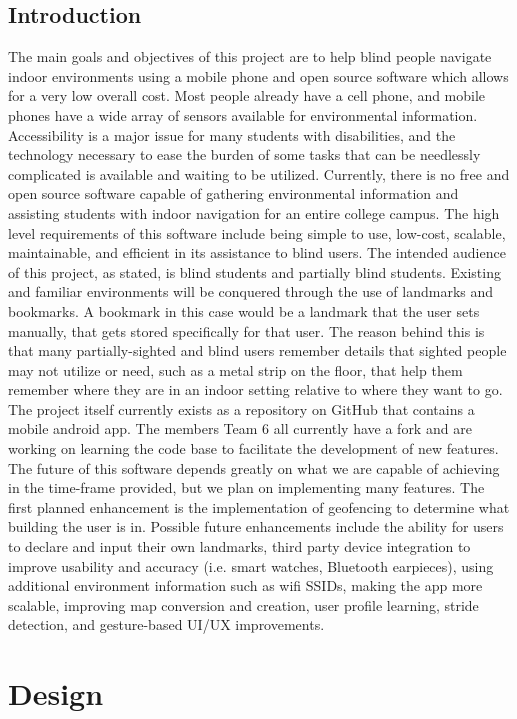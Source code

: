 \documentclass{scrreprt}
\begin{document}
	\section{Introduction}
The main goals and objectives of this project are to help blind people navigate indoor environments using a mobile phone and open source software which allows for a very low overall cost. Most people already have a cell phone, and mobile phones have a wide array of sensors available for environmental information. Accessibility is a major issue for many students with disabilities, and the technology necessary to ease the burden of some tasks that can be needlessly complicated is available and waiting to be utilized. Currently, there is no free and open source software capable of gathering environmental information and assisting students with indoor navigation for an entire college campus.
    The high level requirements of this software include being simple to use, low-cost, scalable, maintainable, and efficient in its assistance to blind users. The intended audience of this project, as stated, is blind students and partially blind students. Existing and familiar environments will be conquered through the use of landmarks and bookmarks. A bookmark in this case would be a landmark that the user sets manually, that gets stored specifically for that user. The reason behind this is that many partially-sighted and blind users remember details that sighted people may not utilize or need, such as a metal strip on the floor, that help them remember where they are in an indoor setting relative to where they want to go.
    The project itself currently exists as a repository on GitHub that contains a mobile android app. The members Team 6 all currently have a fork and are working on learning the code base to facilitate the development of new features. The future of this software depends greatly on what we are capable of achieving in the time-frame provided, but we plan on implementing many features. The first planned enhancement is the implementation of geofencing to determine what building the user is in. Possible future enhancements include the ability for users to declare and input their own landmarks, third party device integration to improve usability and accuracy (i.e. smart watches, Bluetooth earpieces), using additional environment information such as wifi SSIDs, making the app more scalable, improving map conversion and creation, user profile learning, stride detection, and gesture-based UI/UX improvements.
\chapter{Design}
\end{document}
